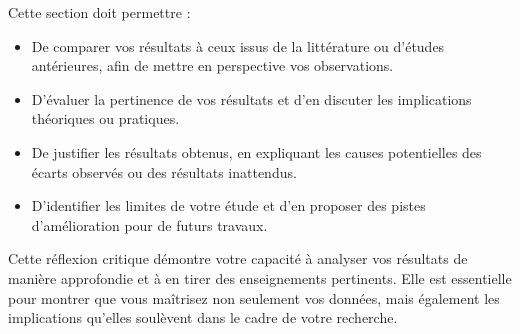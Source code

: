 Cette section doit permettre :
\begin{itemize}
    \item De comparer vos résultats à ceux issus de la littérature ou d'études antérieures, afin de mettre en perspective vos observations.
    \item D'évaluer la pertinence de vos résultats et d'en discuter les implications théoriques ou pratiques.
    \item De justifier les résultats obtenus, en expliquant les causes potentielles des écarts observés ou des résultats inattendus.
    \item D'identifier les limites de votre étude et d'en proposer des pistes d'amélioration pour de futurs travaux.
\end{itemize}

Cette réflexion critique démontre votre capacité à analyser vos résultats de manière approfondie et à en tirer des enseignements pertinents. Elle est essentielle pour montrer que vous maîtrisez non seulement vos données, mais également les implications qu'elles soulèvent dans le cadre de votre recherche.
